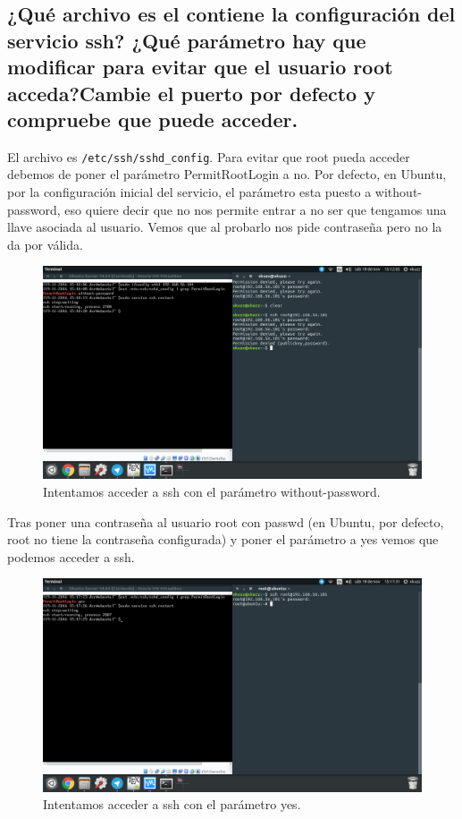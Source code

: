 \begin{flushleft}
\section{¿Qué archivo es el contiene la configuración del servicio ssh? ¿Qué parámetro hay que modificar para evitar que el usuario root acceda?Cambie el puerto por defecto y compruebe que puede acceder.}
El archivo es \verb|/etc/ssh/sshd_config|. \cite{c7a} \linebreak
Para evitar que root pueda acceder debemos de poner el parámetro PermitRootLogin a no. \cite{c7b} Por defecto, en Ubuntu, por la configuración inicial del servicio, el parámetro esta puesto a without-password, eso quiere decir que no nos permite entrar a no ser que tengamos una llave asociada al usuario. Vemos que al probarlo nos pide contraseña pero no la da por válida.
\begin{figure}[H]
	\centering
	\includegraphics[scale=0.3]{rootwp.png}
	\caption{Intentamos acceder a ssh con el parámetro without-password.}
\end{figure}

Tras poner una contraseña al usuario root con passwd (en Ubuntu, por defecto, root no tiene la contraseña configurada) y poner el parámetro a yes vemos que podemos acceder a ssh.

\begin{figure}[H]
	\centering
	\includegraphics[scale=0.3]{rootyes.png}
	\caption{Intentamos acceder a ssh con el parámetro yes.}
\end{figure}


\end{flushleft}
